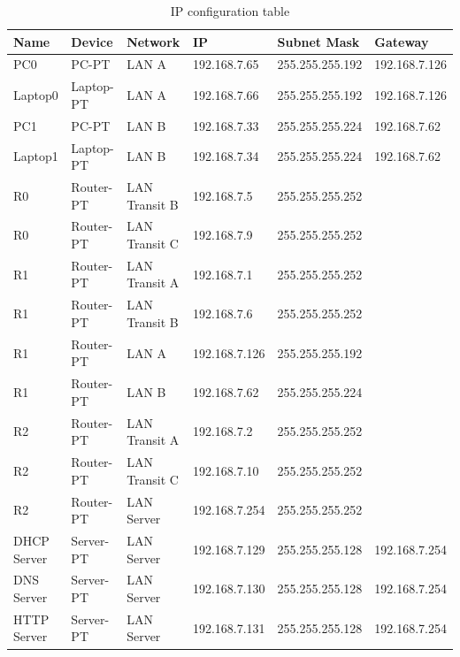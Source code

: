\documentclass[11pt,a4paper]{report}
\begin{document}
\begin{table}[]
\begin{tabular}{llllll}
Name        & Device    & Network       & IP            & Subnet Mask     & Gateway       \\ \hline
PC0         & PC-PT     & LAN A         & 192.168.7.65  & 255.255.255.192 & 192.168.7.126 \\ \hline
Laptop0     & Laptop-PT & LAN A         & 192.168.7.66  & 255.255.255.192 & 192.168.7.126 \\ \hline
PC1         & PC-PT     & LAN B         & 192.168.7.33  & 255.255.255.224 & 192.168.7.62  \\ \hline
Laptop1     & Laptop-PT & LAN B         & 192.168.7.34  & 255.255.255.224 & 192.168.7.62  \\ \hline
R0          & Router-PT & LAN Transit B & 192.168.7.5   & 255.255.255.252 &               \\ \hline
R0          & Router-PT & LAN Transit C & 192.168.7.9   & 255.255.255.252 &               \\ \hline
R1          & Router-PT & LAN Transit A & 192.168.7.1   & 255.255.255.252 &               \\ \hline
R1          & Router-PT & LAN Transit B & 192.168.7.6   & 255.255.255.252 &               \\ \hline
R1          & Router-PT & LAN A         & 192.168.7.126 & 255.255.255.192 &               \\ \hline
R1          & Router-PT & LAN B         & 192.168.7.62  & 255.255.255.224 &               \\ \hline
R2          & Router-PT & LAN Transit A & 192.168.7.2   & 255.255.255.252 &               \\ \hline
R2          & Router-PT & LAN Transit C & 192.168.7.10  & 255.255.255.252 &               \\ \hline
R2          & Router-PT & LAN Server    & 192.168.7.254 & 255.255.255.252 &               \\ \hline
DHCP Server & Server-PT & LAN Server    & 192.168.7.129 & 255.255.255.128 & 192.168.7.254 \\ \hline
DNS Server  & Server-PT & LAN Server    & 192.168.7.130 & 255.255.255.128 & 192.168.7.254 \\ \hline
HTTP Server & Server-PT & LAN Server    & 192.168.7.131 & 255.255.255.128 & 192.168.7.254 \\ \hline
\end{tabular}
\caption{IP configuration table}
\label{tab:iptable}
\end{table}
\end{document}
